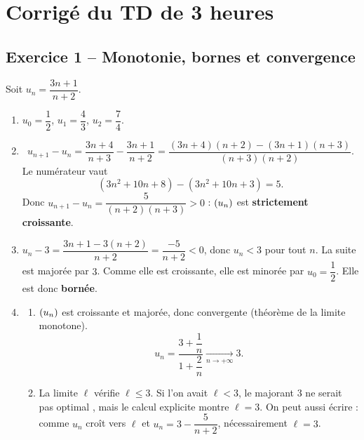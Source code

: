 \documentclass[11pt,a4paper]{article}
\begin{document}

\tableofcontents
\thispagestyle{fancy}
\clearpage

\section{Corrigé du TD de 3 heures}

\subsection{Exercice 1 -- Monotonie, bornes et convergence}

Soit $u_n = \dfrac{3n+1}{n+2}$.

\begin{enumerate}
  \item $u_0 = \dfrac{1}{2}$, \quad $u_1 = \dfrac{4}{3}$, \quad $u_2 = \dfrac{7}{4}$.

  \item
  \[
  u_{n+1}-u_n
  = \dfrac{3n+4}{n+3} - \dfrac{3n+1}{n+2}
  = \dfrac{(3n+4)(n+2)-(3n+1)(n+3)}{(n+3)(n+2)}.
  \]
  Le numérateur vaut
  \[
  (3n^2+10n+8) - (3n^2+10n+3) = 5.
  \]
  Donc $u_{n+1}-u_n = \dfrac{5}{(n+2)(n+3)} > 0$ : $(u_n)$ est \textbf{strictement croissante}.

  \item $u_n - 3 = \dfrac{3n+1-3(n+2)}{n+2} = \dfrac{-5}{n+2} < 0$, donc $u_n < 3$ pour tout $n$. La suite est majorée par $3$. Comme elle est croissante, elle est minorée par $u_0=\dfrac{1}{2}$. Elle est donc \textbf{bornée}.

  \item
  \begin{enumerate}
    \item $(u_n)$ est croissante et majorée, donc convergente (théorème de la limite monotone).
    \[
    u_n = \dfrac{3+\dfrac{1}{n}}{1+\dfrac{2}{n}} \xrightarrow[n\to+\infty]{} 3.
    \]
    \item La limite $\ell$ vérifie $\ell\leq 3$. Si l'on avait $\ell<3$, le majorant $3$ ne serait pas \og optimal \fg{}, mais le calcul explicite montre $\ell=3$. On peut aussi écrire : comme $u_n$ croît vers $\ell$ et $u_n=3-\dfrac{5}{n+2}$, nécessairement $\ell=3$.
  \end{enumerate}
\end{enumerate}
\end{document}
